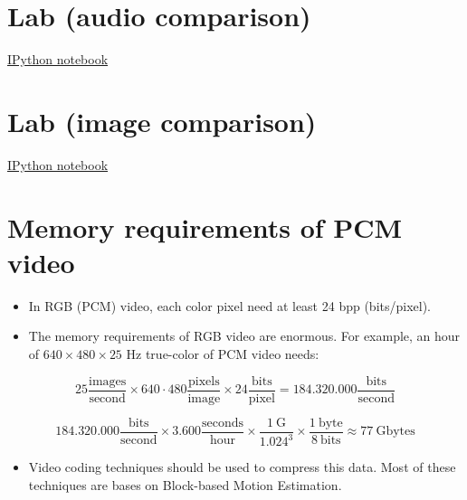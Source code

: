 \section{Lab (audio comparison)}
\href{}{IPython notebook}

\section{Lab (image comparison)}
\href{}{IPython notebook}

\section{Memory requirements of PCM video}

\begin{itemize}
\item In RGB (PCM) video, each color pixel need at least 24 bpp
  (bits/pixel).
\item The memory requirements of RGB video are enormous. For example,
  an hour of \(640\times 480\times 25\) Hz true-color of PCM video
  needs:
\end{itemize}

\begin{equation}
  25\frac{\text{images}}{\text{second}}\times 640\cdot
  480\frac{\text{pixels}}{\text{image}}\times
  24\frac{\text{bits}}{\text{pixel}}=
  184{.}320{.}000\frac{\text{bits}}{\text{second}}
\end{equation}

\begin{equation}
  184{.}320{.}000\frac{\text{bits}}{\text{second}} \times
  3{.}600\frac{\text{seconds}}{\text{hour}} \times
  \frac{1~\text{G}}{1{.}024^3}\times
  \frac{1~\text{byte}}{8~\text{bits}} \approx 77~\text{Gbytes}
\end{equation}

\begin{itemize}
\item Video coding techniques should be used to compress this data. Most of these techniques are bases on Block-based Motion Estimation.
\end{itemize}

